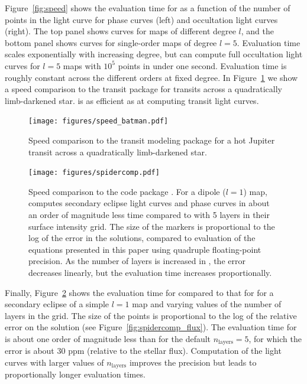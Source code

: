 \documentclass[modern]{aastex61}
\begin{document}
Figure~\ref{fig:speed} shows the evaluation time for \starry
as a function of the number of points in the light curve for phase curves
(left) and occultation light curves (right). The top panel shows curves for
maps of different degree $l$, and the bottom panel shows curves for single-order
maps of degree $l = 5$. Evaluation time scales exponentially with increasing
degree, but \starry can compute full occultation light curves for $l = 5$ maps
with $10^5$ points in under one second. Evaluation time is roughly constant
across the different orders at fixed degree.
In Figure~\ref{fig:speed_batman} we show a speed comparison
to the \batman transit package \citep{Kreidberg2015} for transits across a
quadratically limb-darkened star. \starry is as efficient as \batman at
computing transit light curves.

\begin{figure}[p!]
    \begin{centering}
    \texttt{[image: figures/speed\_batman.pdf]}
    \caption{\label{fig:speed_batman}
             Speed comparison to the \batman transit modeling package
             \citep{Kreidberg2015} for a hot Jupiter transit across a
             quadratically limb-darkened star.
             }
    \end{centering}
\end{figure}

\begin{figure}[t!]
    \begin{centering}
    \texttt{[image: figures/spidercomp.pdf]}
    \caption{\label{fig:spidercomp}
             Speed comparison to the \spiderman code package \citep{Louden2018}.
             For a dipole ($l = 1$) map, \starry computes secondary eclipse
             light curves and phase curves in about an order of magnitude less
             time compared to \spiderman with 5 layers in their surface intensity
             grid. The size of the markers is proportional to the log of the
             error in the solutions, compared to evaluation of the equations
             presented in this paper using quadruple floating-point precision.
             As the number of layers is increased in \spiderman, the error
             decreases linearly, but the evaluation time increases proportionally.
             }
    \end{centering}
\end{figure}

Finally, Figure~\ref{fig:spidercomp} shows the evaluation time for \starry
compared to that for \spiderman \citep{Louden2018} for a secondary eclipse
of a simple $l = 1$ map and varying values of the number of layers in the
\spiderman grid. The size of the points is proportional to the log of the
relative error on the solution (see Figure~\ref{fig:spidercomp_flux}).
The evaluation time for \starry is about one order of magnitude less than
\spiderman for the default $n_\mathrm{layers}=5$, for which the error
is about 30 ppm (relative to the stellar flux). Computation of the \spiderman
light curves with larger values of $n_\mathrm{layers}$ improves the precision
but leads to proportionally longer evaluation times.
\end{document}
